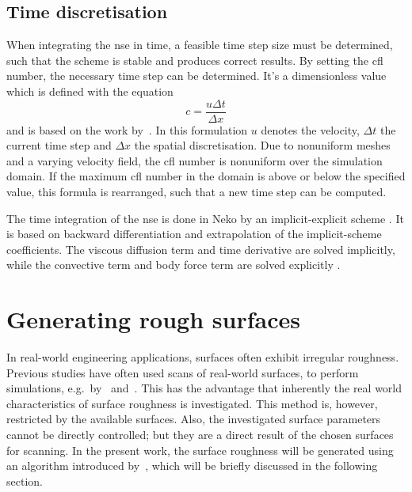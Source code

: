 \subsection{Time discretisation}\label{subsec: time discretization}

When integrating the \acrshort{nse} in time, a feasible time step size must be determined, such that the scheme is stable and produces correct results.
By setting the \acrfull{cfl} number, the necessary time step can be determined.
It's a dimensionless value which is defined with the equation
\begin{equation}\label{eq: cfl number}
    c = \frac{u\Delta t}{\Delta x}
\end{equation}
and is based on the work by~\cite{courantBerPartiellenDifferenzengleiehungen}.
In this formulation $u$ denotes the velocity, $\Delta t$ the current time step and $\Delta x$ the spatial discretisation.
Due to nonuniform meshes and a varying velocity field, the \acrshort{cfl} number is nonuniform over the simulation domain.
If the maximum \acrshort{cfl} number in the domain is above or below the specified value, this formula is rearranged, such that a new time step can be computed.

The time integration of the \acrshort{nse} is done in Neko by an implicit-explicit scheme \citep{janssonNekoModernPortable2024}.
It is based on backward differentiation and extrapolation of the implicit-scheme coefficients.
The viscous diffusion term and time derivative are solved implicitly, while the convective term and body force term are solved explicitly \citep{janssonNekoModernPortable2024}.


\section{Generating rough surfaces}\label{sec:generating rough surfaces}
In real-world engineering applications, surfaces often exhibit irregular roughness.
Previous studies have often used scans of real-world surfaces, to perform simulations, e.g.\ by~\cite{thakkarInvestigationTurbulentFlow2017, demaioDirectNumericalSimulation2023} and~\cite{busseReynoldsnumberDependenceNearwall2017}.
This has the advantage that inherently the real world characteristics of surface roughness is investigated.
This method is, however, restricted by the available surfaces.
Also, the investigated surface parameters cannot be directly controlled; but they are a direct result of the chosen surfaces for scanning.
In the present work, the surface roughness will be generated using an algorithm introduced by~\cite{perez-rafolsGeneratingRandomlyRough2019}, which will be briefly discussed in the following section.

